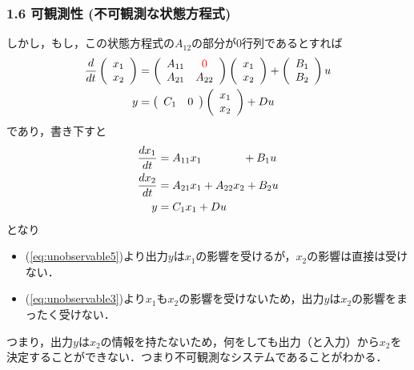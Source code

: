 \begin{frame}[t]
\frametitle{1.6 可観測性 (不可観測な状態方程式)}
しかし，もし，この状態方程式の$A_{12}$の部分が$0$行列であるとすれば
\begin{align}
 \frac{d}{dt}
  \left(\begin{array}{c}
         {x}_1 \\
   {x}_2
  \end{array}\right)
  &=
  \left(\begin{array}{cc}
         {A}_{11} & \Red{0} \\
       {A}_{21} & {A}_{22}
  \end{array}\right)
  \left(\begin{array}{c}
         {x}_1 \\
   {x}_2
  \end{array}\right)
  +
  \left(\begin{array}{c}
         {B}_1 \\
   {B}_2
  \end{array}\right)
  u
\label{eq:unobservable1} \\
 y &=
  \left(\begin{array}{cc}
         {C}_1 & 0
  \end{array}\right)
  \left(\begin{array}{c}
         {x}_1 \\
   {x}_2
  \end{array}\right)
  + D u
\label{eq:unobservable2}\vspace{-3mm}
\end{align}
であり，書き下すと\vspace{-3mm}
\begin{align}
 \frac{dx_1}{dt} &= A_{11} x_1 \ \ \ \ \ \ \ \ \ \ \ + B_1 u
\label{eq:unobservable3} \\
 \frac{dx_2}{dt} &= A_{21} x_1 + A_{22} x_2 + B_2 u
\label{eq:unobservable4} \\
 y & = C_1 x_1 + Du
\label{eq:unobservable5}\vspace{-3mm}
\end{align}
となり
\begin{itemize}
\item (\ref{eq:unobservable5})より出力$y$は$x_1$の影響を受けるが，$x_2$の影響は直接は受けない．
\item (\ref{eq:unobservable3})より$x_1$も$x_2$の影響を受けないため，出力$y$は$x_2$の影響をまったく受けない．
\end{itemize}
つまり，出力$y$は$x_2$の情報を持たないため，何をしても出力（と入力）から$x_2$を決定することができない．つまり不可観測なシステムであることがわかる．
\end{frame}



